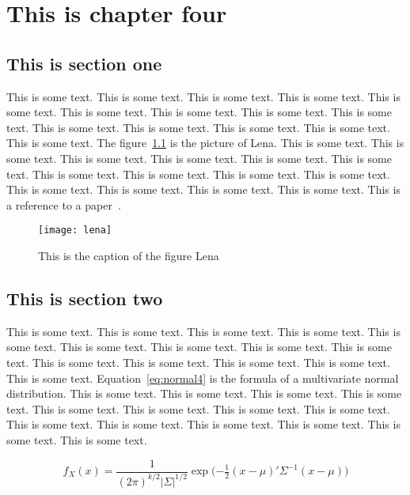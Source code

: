 \chapter{This is chapter four}


\section{This is section one}

This is some text. This is some text. This is some text. This is some text. This is some text. This is some text. This is some text. 
This is some text. This is some text. This is some text. This is some text. This is some text. This is some text. This is some text. 
The figure~\ref{fig:lena4} is the picture of Lena.
This is some text. This is some text. This is some text. This is some text. This is some text. This is some text. This is some text. 
This is some text. This is some text. This is some text. This is some text. This is some text. This is some text. This is some text. 
This is a reference to a paper~\cite{Garcia_2008_CVGPU}.

\begin{figure}[htbp]
    \centering
    \texttt{[image: lena]}
    \caption{This is the caption of the figure Lena}
    \label{fig:lena4}
\end{figure}


\section{This is section two}

This is some text. This is some text. This is some text. This is some text. This is some text. This is some text. This is some text. 
This is some text. This is some text. This is some text. This is some text. This is some text. This is some text. This is some text. 
Equation~\ref{eq:normal4} is the formula of a multivariate normal distribution.
This is some text. This is some text. This is some text. This is some text. This is some text. This is some text. This is some text. 
This is some text. This is some text. This is some text. This is some text. This is some text. This is some text. This is some text. 

\begin{equation}
    f_X(x) = \frac{1}{ (2\pi)^{k/2}|\Sigma|^{1/2} } \exp\!\Big( {-\tfrac{1}{2}}(x-\mu)'\Sigma^{-1}(x-\mu) \Big)
    \label{eq:normal4}
\end{equation}



